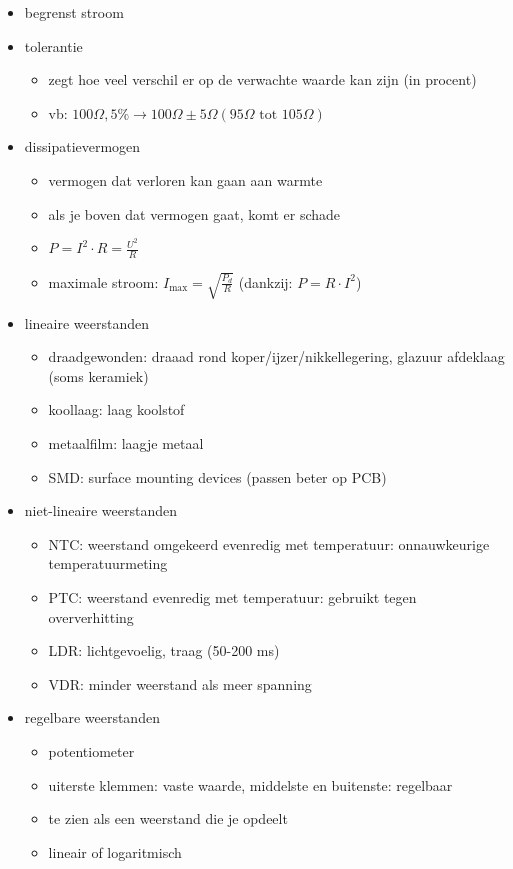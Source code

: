 \documentclass[11pt]{article}
\let\originalitem\item
\renewcommand{\item}{\originalitem[]}
\begin{document}
\begin{preview}
\begin{itemize}
	\item begrenst stroom
	\item tolerantie
	\begin{itemize}
		\item zegt hoe veel verschil er op de verwachte waarde kan zijn (in procent)
		\item vb: $100 \Omega, 5\% \rightarrow 100 \Omega \pm 5 \Omega (95 \Omega \textrm{ tot } 105 \Omega)$
	\end{itemize}
	\item dissipatievermogen
	\begin{itemize}
		\item vermogen dat verloren kan gaan aan warmte
		\item als je boven dat vermogen gaat, komt er schade
		\item $P = I^2 \cdot R = \frac{U^2}{R}$
		\item maximale stroom: $I_{\textrm{max}} = \sqrt{\frac{P_d}{R}}$ (dankzij: $P=R \cdot I^2$)
	\end{itemize}
	\item lineaire weerstanden
	\begin{itemize}
		\item draadgewonden: draaad rond koper/ijzer/nikkellegering, glazuur afdeklaag (soms keramiek)
		\item koollaag: laag koolstof
		\item metaalfilm: laagje metaal
		\item SMD: surface mounting devices (passen beter op PCB)
	\end{itemize}
	\item niet-lineaire weerstanden
	\begin{itemize}
		\item NTC: weerstand omgekeerd evenredig met temperatuur: onnauwkeurige temperatuurmeting
		\item PTC: weerstand evenredig met temperatuur: gebruikt tegen oververhitting
		\item LDR: lichtgevoelig, traag (50-200 ms)
		\item VDR: minder weerstand als meer spanning
	\end{itemize}
	\item regelbare weerstanden
	\begin{itemize}
		\item potentiometer
		\item uiterste klemmen: vaste waarde, middelste en buitenste: regelbaar
		\item te zien als een weerstand die je opdeelt
		\item lineair of logaritmisch
	\end{itemize}
\end{itemize}


\end{preview}
\end{document}
